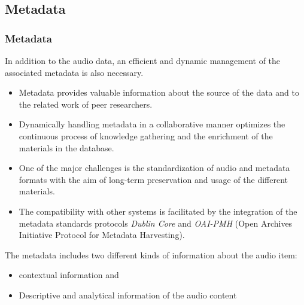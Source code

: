 \documentclass[final, hyperref, table]{beamer}
\begin{document}
\subsection{Metadata}\label{sec:metadata}
\begin{frame}\frametitle{Metadata}

 In addition to the audio data, an efficient and dynamic
    management of the associated metadata is also necessary.
  \begin{itemize}
   \item Metadata
    provides valuable information about the \alert{source of the data} and to
    the related \alert{work of peer researchers}.
  \item Dynamically handling
    metadata in a \alert{collaborative} manner optimizes the continuous
    process of knowledge gathering and the \alert{enrichment} of the materials
    in the database.
  \item One of the major challenges is the
    \alert{standardization} of audio and metadata formats with the aim of
    long-term preservation and usage of the different materials.
  \item The compatibility with other systems is facilitated by the integration
    of the \alert{metadata standards protocols} \emph{Dublin Core} and
    \emph{OAI-PMH} (Open Archives Initiative Protocol for Metadata
    Harvesting).
  \end{itemize}

The metadata includes two different kinds of information about the audio item:
\begin{itemize}
\item contextual information and
\item Descriptive and analytical information of the audio content
\end{itemize}
\end{frame}
\end{document}
